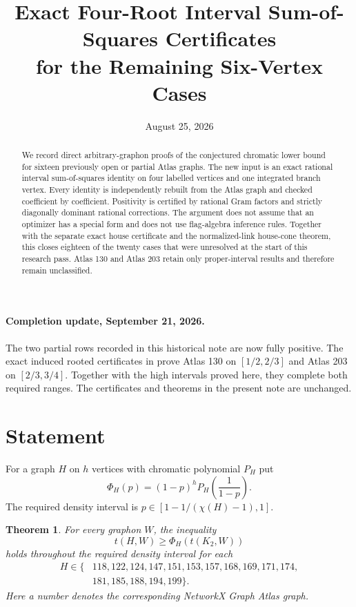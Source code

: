 \documentclass[11pt]{article}
\title{Exact Four-Root Interval Sum-of-Squares Certificates\\
for the Remaining Six-Vertex Cases}
\author{}
\date{August 25, 2026}
\newtheorem{theorem}{Theorem}
\begin{document}
\maketitle

\begin{abstract}
We record direct arbitrary-graphon proofs of the conjectured chromatic lower
bound for sixteen previously open or partial Atlas graphs.  The new input is
an exact rational interval sum-of-squares identity on four labelled vertices
and one integrated branch vertex.  Every identity is independently rebuilt
from the Atlas graph and checked coefficient by coefficient.  Positivity is
certified by rational Gram factors and strictly diagonally dominant rational
corrections.  The argument does not assume that an optimizer has a special
form and does not use flag-algebra inference rules.  Together with the
separate exact house certificate and the normalized-link house-cone theorem,
this closes eighteen of the twenty cases that were unresolved at the start of
this research pass.  Atlas 130 and Atlas 203 retain only proper-interval
results and therefore remain unclassified.
\end{abstract}

\paragraph{Completion update, September 21, 2026.}
The two partial rows recorded in this historical note are now fully positive.
The exact induced rooted certificates in
 prove Atlas 130 on
$[1/2,2/3]$ and Atlas 203 on $[2/3,3/4]$.  Together with the high intervals
proved here, they complete both required ranges.  The certificates and
theorems in the present note are unchanged.

\section{Statement}

For a graph $H$ on $h$ vertices with chromatic polynomial $P_H$ put
\[
 \Phi_H(p)=(1-p)^hP_H\!\left(\frac1{1-p}\right).
\]
The required density interval is $p\in[1-1/(\chi(H)-1),1]$.

\begin{theorem}\label{thm:classification}
For every graphon $W$, the inequality
\[
             t(H,W)\geq \Phi_H(t(K_2,W))
\]
holds throughout the required density interval for each
\[
\begin{split}
H\in\{&118,122,124,147,151,153,157,168,169,171,174,\\
       &181,185,188,194,199\}.
\end{split}
\]
Here a number denotes the corresponding NetworkX Graph Atlas graph.
\end{theorem}
\end{document}
